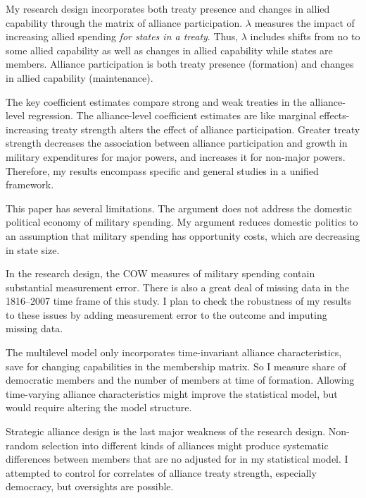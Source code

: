 \documentclass[12pt]{article}
\begin{document}
My research design incorporates both treaty presence and changes in allied capability through the matrix of alliance participation. 
$\lambda$ measures the impact of increasing allied spending \textit{for states in a treaty}. 
Thus, $\lambda$ includes shifts from no to some allied capability as well as changes in allied capability while states are members.
Alliance participation is both treaty presence (formation) and changes in allied capability (maintenance). 


The key coefficient estimates compare strong and weak treaties in the alliance-level regression. 
The alliance-level coefficient estimates are like marginal effects- increasing treaty strength alters the effect of alliance participation.
Greater treaty strength decreases the association between alliance participation and growth in military expenditures for major powers, and increases it for non-major powers. 
Therefore, my results encompass specific and general studies in a unified framework. 


This paper has several limitations.
The argument does not address the domestic political economy of military spending. 
My argument reduces domestic politics to an assumption that military spending has opportunity costs, which are decreasing in state size. 


In the research design, the COW measures of military spending contain substantial measurement error. 
There is also a great deal of missing data in the 1816--2007 time frame of this study. 
I plan to check the robustness of my results to these issues by adding measurement error to the outcome and imputing missing data.


The multilevel model only incorporates time-invariant alliance characteristics, save for changing capabilities in the membership matrix. 
So I measure share of democratic members and the number of members at time of formation. 
Allowing time-varying alliance characteristics might improve the statistical model, but would require altering the model structure. 


Strategic alliance design is the last major weakness of the research design. 
Non-random selection into different kinds of alliances might produce systematic differences between members that are no adjusted for in my statistical model. 
I attempted to control for correlates of alliance treaty strength, especially democracy, but oversights are possible. 
\end{document}
